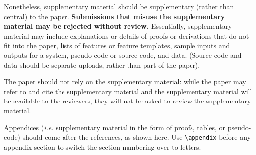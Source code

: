 \documentclass[11pt,a4paper]{article}
\begin{document}
Nonetheless, supplementary material should be supplementary (rather
than central) to the paper. \textbf{Submissions that misuse the supplementary 
material may be rejected without review.}
Essentially, supplementary material may include explanations or details
of proofs or derivations that do not fit into the paper, lists of
features or feature templates, sample inputs and outputs for a system,
pseudo-code or source code, and data. (Source code and data should
be separate uploads, rather than part of the paper).

The paper should not rely on the supplementary material: while the paper
may refer to and cite the supplementary material and the supplementary material will be available to the
reviewers, they will not be asked to review the
supplementary material.

Appendices ({\em i.e.} supplementary material in the form of proofs, tables,
or pseudo-code) should come after the references, as shown here. Use
\verb|\appendix| before any appendix section to switch the section
numbering over to letters.
\end{document}
